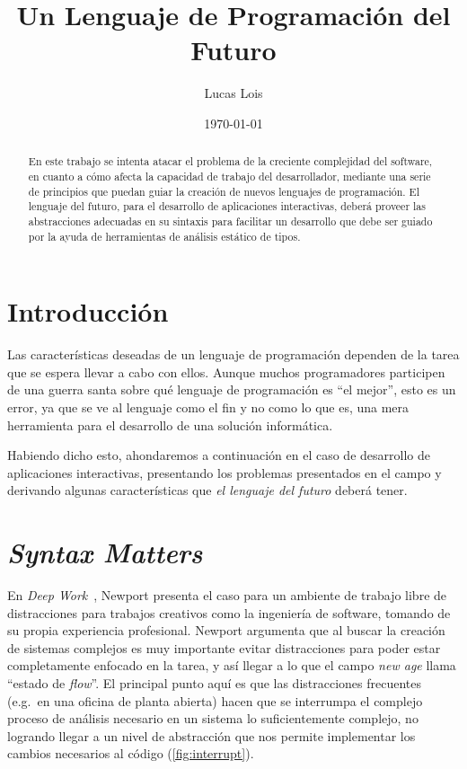 \documentclass[12pt]{article}
\title{Un Lenguaje de Programación del Futuro}
\author{Lucas Lois}
\date{\today}
\begin{document}
\maketitle
\begin{abstract}

En este trabajo se intenta atacar el problema de la creciente complejidad del
software, en cuanto a cómo afecta la capacidad de trabajo del desarrollador,
mediante una serie de principios que puedan guiar la creación de nuevos
lenguajes de programación.
El lenguaje del futuro, para el desarrollo de aplicaciones interactivas, deberá
proveer las abstracciones adecuadas en su sintaxis para facilitar un desarrollo
que debe ser guiado por la ayuda de herramientas de análisis estático de tipos.

\end{abstract}

\section{Introducción}

Las características deseadas de un lenguaje de programación dependen de la
tarea que se espera llevar a cabo con ellos.
Aunque muchos programadores participen de una guerra santa sobre qué lenguaje
de programación es ``el mejor'', esto es un error, ya que se ve al lenguaje
como el fin y no como lo que es, una mera herramienta para el desarrollo de una
solución informática.

Habiendo dicho esto, ahondaremos a continuación en el caso de desarrollo de
aplicaciones interactivas, presentando los problemas presentados en el campo y
derivando algunas características que \emph{el lenguaje del futuro} deberá
tener.

\section{\emph{Syntax Matters}}

En \emph{Deep Work}~\autocite{deepwork}, Newport presenta el caso para un
ambiente de trabajo libre de distracciones para trabajos creativos como la
ingeniería de software, tomando de su propia experiencia profesional.
Newport argumenta que al buscar la creación de sistemas complejos es muy importante
evitar distracciones para poder estar completamente enfocado en la tarea, y
así llegar a lo que el campo \emph{new age} llama ``estado de \emph{flow}''.
El principal punto aquí es que las distracciones frecuentes (e.g.\ en una
oficina de planta abierta) hacen que se interrumpa el complejo proceso de
análisis necesario en un sistema lo suficientemente complejo, no logrando
llegar a un nivel de abstracción que nos permite implementar los cambios
necesarios al código (\autoref{fig:interrupt}).
\end{document}
